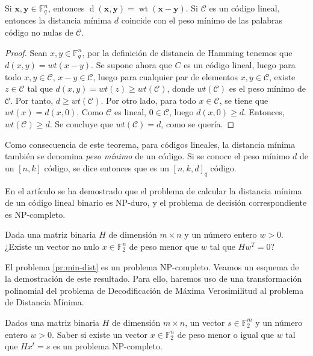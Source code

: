 \begin{theorem}
    Si $\mathbf{x}, \mathbf{y} \in \mathbb{F}_q^n$, entonces $\operatorname{d}(\mathbf{x},\mathbf{y}) = \operatorname{wt}(\mathbf{x}-\mathbf{y})$. Si $\mathcal{C}$ es un código lineal, entonces la distancia mínima $d$ coincide con el peso mínimo de las palabras código no nulas de $\mathcal{C}$.
\end{theorem}

\begin{proof}
    Sean $x,y \in \mathbb{F}_q^n$, por la definición de distancia de Hamming tenemos que $d(x,y) = wt(x-y)$. Se supone ahora que $C$ es un código lineal, luego para todo $x,y \in \mathcal{C}$, $x-y \in \mathcal{C}$, luego para cualquier par de elementos $x,y \in \mathcal{C}$, existe $z \in \mathcal{C}$ tal que $d(x,y) = wt(z) \geq wt(\mathcal{C})$, donde $wt(\mathcal{C})$ es el peso mínimo de $\mathcal{C}$. Por tanto, $d \geq wt(\mathcal{C})$. Por otro lado, para todo $x \in \mathcal{C}$, se tiene que $wt(x) = d(x,0)$. Como $\mathcal{C}$ es lineal, $0 \in \mathcal{C}$, luego $d(x,0) \geq d$. Entonces, $wt(\mathcal{C}) \geq d$. Se concluye que $wt(\mathcal{C}) = d$, como se quería.
\end{proof}

Como consecuencia de este teorema, para códigos lineales, la distancia mínima también se denomina \emph{peso mínimo} de un código. Si se conoce el peso mínimo $d$ de un $[n,k]$ código, se dice entonces que es un $[n,k,d]_q$ código.

En el artículo \cite{Vardy_1997} se ha demostrado que el problema de calcular la distancia mínima de un código lineal binario es NP-duro, y el problema de decisión correspondiente es NP-completo.

\begin{problemth}
    \label{pr:min-dist}
    Dada una matriz binaria $H$ de dimensión $m \times n$ y un número entero $w > 0$. ¿Existe un vector no nulo $x \in \mathbb{F}_2^n$ de peso menor que $w$ tal que $Hw^T = 0$? 
\end{problemth}

El problema \ref{pr:min-dist} es un problema NP-completo. Veamos un esquema de la demostración de este resultado. Para ello, haremos uso de una transformación polinomial del problema de Decodificación de Máxima Verosimilitud al problema de Distancia Mínima.

\begin{theorem}
    \label{th:dmv}
    Dados una matriz binaria $H$ de dimensión $m \times n$, un vector $s \in \mathbb{F}_2^m$ y un número entero $w > 0$. Saber si existe un vector $x \in \mathbb{F}_2^n$ de peso menor o igual que $w$ tal que $Hx^t = s$ es un problema NP-completo.
\end{theorem}

